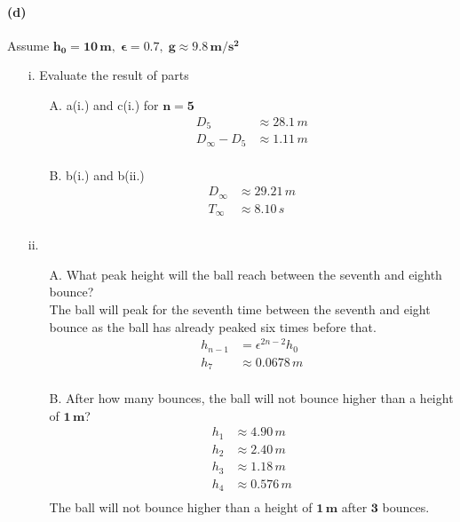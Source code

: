 \documentclass[]{article}
\begin{document}
{		\paragraph{(d)} Assume $\bm{ h_0 = 10 \, m, \; \epsilon = 0.7, \; g \approx 9.8 \, m/s^2 }$
		\begin{enumerate}[label=\roman*]
			\item[i.] Evaluate the result of parts
				\begin{enumerate}[topsep=0pt]
					\item[A.] a(i.) and c(i.) for $\bm{n = 5}$
						\begin{equation*}
							\begin{split}
								D_5 &\approx 28.1 \, m \\
								D_{\infty} - D_5 &\approx 1.11 \, m \\
							\end{split}
						\end{equation*}
					\item[B.] b(i.) and b(ii.)
						\begin{equation*}
							\begin{split}
								D_{\infty} &\approx 29.21 \, m \\
								T_{\infty} &\approx 8.10 \, s \\
							\end{split}
						\end{equation*}
				\end{enumerate}	
			\item[ii.]
				\begin{enumerate}[topsep=0pt]
					\item[A.] What peak height will the ball reach between the seventh and eighth bounce? \\
						The ball will peak for the seventh time between the seventh and eight bounce as the ball has already peaked six times before that.
							\begin{equation*}
								\begin{split}
									h_{n-1} &= \epsilon^{2n-2} h_0 \\
									h_{7} &\approx 0.0678 \, m \\
								\end{split}
							\end{equation*}
					\item[B.] After how many bounces, the ball will not bounce higher than a height of $\bm{1 \, m}$?
						\begin{equation*}
							\begin{split}
								h_{1} &\approx 4.90 \, m \\
								h_{2} &\approx 2.40 \, m \\
								h_{3} &\approx 1.18 \, m \\
								h_{4} &\approx 0.576 \, m \\
							\end{split}
						\end{equation*}
						The ball will not bounce higher than a height of $\bm{1 \, m}$ after $\bm{3}$ bounces.
				\end{enumerate}	
		\end{enumerate}
		
}
\end{document}
